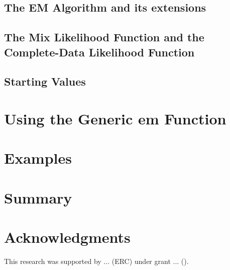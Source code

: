 \documentclass[nojss]{jss}
\begin{document}
      \subsection{The EM Algorithm and its extensions}
      \subsection{The Mix Likelihood Function and the Complete-Data Likelihood Function}
      \subsection{Starting Values}
   \section{Using the Generic em Function}
   \section{Examples}
   \section{Summary}
   \section*{Acknowledgments}
   This research was supported by ... (ERC) under grant ... (). 
   
\end{document}
